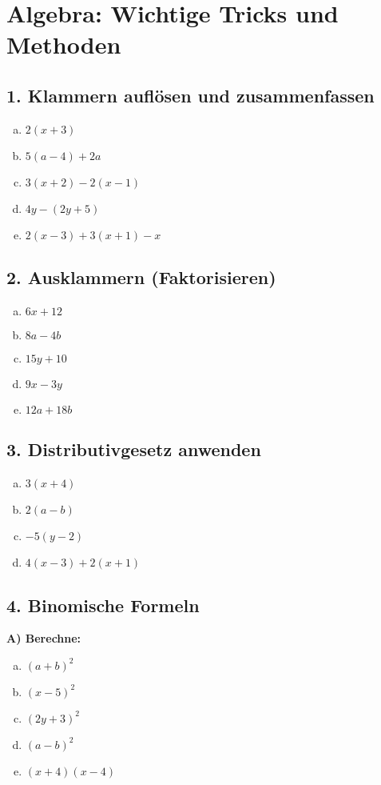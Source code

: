 
\section*{Algebra: Wichtige Tricks und Methoden}

\subsection*{1. Klammern auflösen und zusammenfassen}
\begin{enumerate}[a)]
    \item $2(x+3)$
    \item $5(a-4) + 2a$
    \item $3(x+2) - 2(x-1)$
    \item $4y - (2y + 5)$
    \item $2(x-3) + 3(x+1) - x$
\end{enumerate}

\subsection*{2. Ausklammern (Faktorisieren)}
\begin{enumerate}[a)]
    \item $6x + 12$
    \item $8a - 4b$
    \item $15y + 10$
    \item $9x - 3y$
    \item $12a + 18b$
\end{enumerate}

\subsection*{3. Distributivgesetz anwenden}
\begin{enumerate}[a)]
    \item $3(x+4)$
    \item $2(a-b)$
    \item $-5(y-2)$
    \item $4(x-3) + 2(x+1)$
\end{enumerate}

\subsection*{4. Binomische Formeln}
\textbf{A) Berechne:}
\begin{enumerate}[a)]
    \item $(a+b)^2$
    \item $(x-5)^2$
    \item $(2y+3)^2$
    \item $(a-b)^2$
    \item $(x+4)(x-4)$
\end{enumerate}

